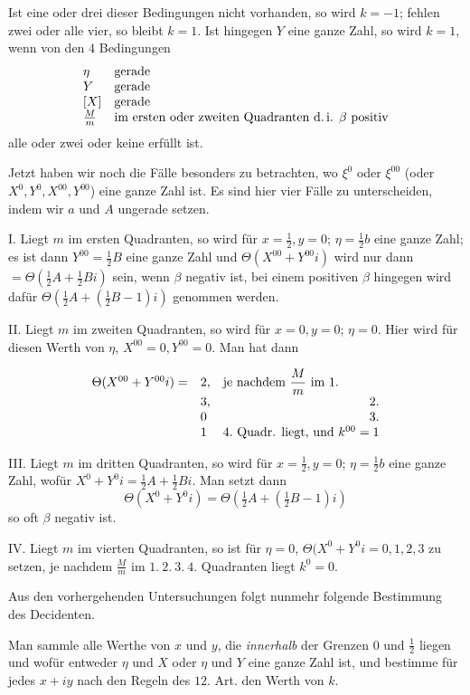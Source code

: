 Ist eine oder drei dieser Bedingungen nicht vorhanden, so wird $k=-1$; fehlen zwei oder alle vier, so bleibt $k=1$. Ist hingegen $Y$ eine ganze Zahl, so wird $k=1$, wenn von den $4$ Bedingungen
\[
\begin{array}{ll}
\eta&\text{gerade}\\
Y&\text{gerade}\\
\relax[X]&\text{gerade}\\
\frac{M}{m}&\text{im ersten oder zweiten Quadranten d.\,i. }\beta\text{ positiv}
\end{array}
\]
alle oder zwei oder keine erfüllt ist.

Jetzt haben wir noch die Fälle besonders zu betrachten, wo $\xi^0$ oder $\xi^{00}$ (oder $X^0,Y^0,X^{00},Y^{00}$) eine ganze Zahl ist. Es sind hier vier Fälle zu unterscheiden, indem wir $a$ und $A$ ungerade setzen.

I. Liegt $m$ im ersten Quadranten, so wird für $x=\frac12,y=0$; $\eta=\frac12b$ eine ganze Zahl; es ist dann $Y^{00}=\frac12B$ eine ganze Zahl und $\Theta(X^{00}+Y^{00}i)$ wird nur dann $=\Theta(\frac12A+\frac12Bi)$ sein, wenn $\beta$ negativ ist, bei einem positiven $\beta$ hingegen wird dafür $\Theta(\frac12A+(\frac12B-1)i)$ genommen werden.

II. Liegt $m$ im zweiten Quadranten, so wird für $x=0,y=0$; $\eta=0$. Hier wird für diesen Werth von $\eta$, $X^{00}=0,Y^{00}=0$. Man hat dann

\[
\begin{array}{rll}
\Theta(X^{00}+Y^{00}i)=&2,&\text{je nachdem }\dfrac{M}{m}\text{ im }1.\\
&3,&\hfill2.\\
&0&\hfill3.\\
&1&\hfill4.\text{ Quadr. liegt, und }k^{00}=1
\end{array}
\]

III. Liegt $m$ im dritten Quadranten, so wird für $x=\frac12,y=0$; $\eta=\frac12b$ eine ganze Zahl, wofür $X^0+Y^0i=\frac12A+\frac12Bi$. Man setzt dann
\[
\Theta(X^0+Y^0i)=\Theta(\tfrac12A+(\tfrac12B-1)i)
\]
so oft $\beta$ negativ ist.

IV. Liegt $m$ im vierten Quadranten, so ist für $\eta=0$,
$\Theta(X^0+Y^0i=0,1,2,3$ zu setzen, je nachdem $\frac{M}{m}$ im $1.\ 2.\ 3.\ 4.$ Quadranten liegt
$k^0=0$.

Aus den vorhergehenden Untersuchungen folgt nunmehr folgende Bestimmung des Decidenten.

Man sammle alle Werthe von $x$ und $y$, die \emph{innerhalb} der Grenzen $0$ und $\frac12$ liegen und wofür entweder $\eta$ und $X$ oder $\eta$ und $Y$ eine ganze Zahl ist, und bestimme für jedes $x+iy$ nach den Regeln des $12$. Art. den Werth von $k$.

